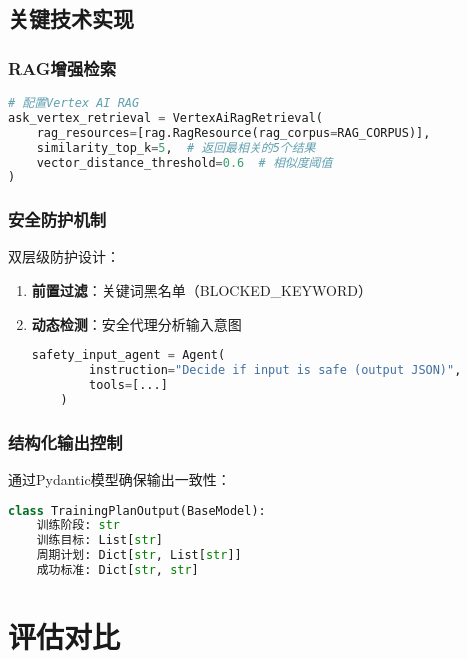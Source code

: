 \documentclass{article}
\theoremstyle{plain}
\theoremstyle{definition}
\theoremstyle{remark}
\begin{document}
\subsection{关键技术实现}

\subsubsection{RAG增强检索}
\begin{lstlisting}[language=Python]
# 配置Vertex AI RAG
ask_vertex_retrieval = VertexAiRagRetrieval(
    rag_resources=[rag.RagResource(rag_corpus=RAG_CORPUS)],
    similarity_top_k=5,  # 返回最相关的5个结果
    vector_distance_threshold=0.6  # 相似度阈值
)
\end{lstlisting}

\subsubsection{安全防护机制}
双层级防护设计：
\begin{enumerate}
    \item \textbf{前置过滤}：关键词黑名单（BLOCKED\_KEYWORD）
    \item \textbf{动态检测}：安全代理分析输入意图
    \begin{lstlisting}[language=Python]
    safety_input_agent = Agent(
        instruction="Decide if input is safe (output JSON)",
        tools=[...]
    )
    \end{lstlisting}
\end{enumerate}

\subsubsection{结构化输出控制}
通过Pydantic模型确保输出一致性：
\begin{lstlisting}[language=Python]
class TrainingPlanOutput(BaseModel):
    训练阶段: str
    训练目标: List[str]
    周期计划: Dict[str, List[str]]
    成功标准: Dict[str, str]
\end{lstlisting}


\section{评估对比}
\end{document}
